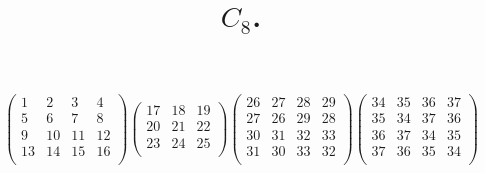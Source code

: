 \documentclass[12pt,a4paper]{amsart}
\title{$C_8$.}
\begin{document}
\maketitle

\begin{align*}
  \left(
  \begin{array}{c|c|c|c}
    1&2&3&4\\
\hline
    5&6&7&8\\
\hline
    9&10&11&12\\
\hline
    13&14&15&16\\
  \end{array}
\right)
  \left(
  \begin{array}{c|c|c}
    17&18&19\\
\hline
    20&21&22\\
\hline
    23&24&25\\
  \end{array}
\right)
  \left(
  \begin{array}{cc|cc}
    26&27&28&29\\
    27&26&29&28\\
\hline
    30&31&32&33\\
    31&30&33&32\\
  \end{array}
\right)
  \left(
  \begin{array}{cccc}
    34&35&36&37\\
    35&34&37&36\\
    36&37&34&35\\
    37&36&35&34\\
  \end{array}
\right)
\end{align*}
\end{document}
